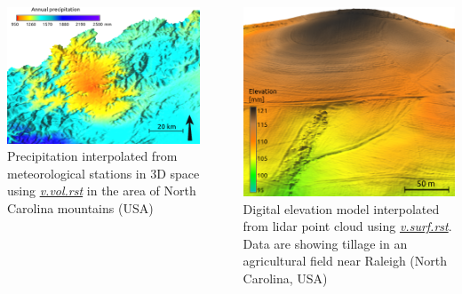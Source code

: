 \documentclass[25pt, margin=0mm, innermargin=15mm, blockverticalspace=15mm, colspace=15mm, subcolspace=8mm]{tikzposter}
\newcommand{\gmodule}[1]{\href{http://grass.osgeo.org/grass70/manuals/#1.html}{\emph{#1}}}
\begin{document}
\begin{columns}
{\begin{minipage}{0.5\linewidth}
\includegraphics[width=\textwidth]{interpolation_precip_vvolrst}
Precipitation interpolated from meteorological stations in 3D space using \gmodule{v.vol.rst} in the area of North Carolina mountains (USA)
\end{minipage}
~
\begin{minipage}{0.5\linewidth}
\includegraphics[width=\textwidth]{elevation_lidar}
Digital elevation model interpolated from lidar point cloud using \gmodule{v.surf.rst}. Data are showing tillage in an agricultural field near Raleigh (North Carolina, USA)
\end{minipage}
}


\end{columns}
\end{document}
